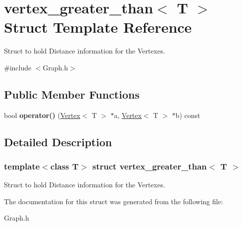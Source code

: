 \hypertarget{structvertex__greater__than}{}\section{vertex\+\_\+greater\+\_\+than$<$ T $>$ Struct Template Reference}
\label{structvertex__greater__than}


Struct to hold Distance information for the Vertexes.  




{\ttfamily \#include $<$Graph.\+h$>$}

\subsection*{Public Member Functions}
\begin{DoxyCompactItemize}
\item 
\hypertarget{structvertex__greater__than_acb041eee618f7d56a3685c7aaf347df6}{}\label{structvertex__greater__than_acb041eee618f7d56a3685c7aaf347df6} 
bool {\bfseries operator()} (\hyperlink{class_vertex}{Vertex}$<$ T $>$ $\ast$a, \hyperlink{class_vertex}{Vertex}$<$ T $>$ $\ast$b) const
\end{DoxyCompactItemize}


\subsection{Detailed Description}
\subsubsection*{template$<$class T$>$\newline
struct vertex\+\_\+greater\+\_\+than$<$ T $>$}

Struct to hold Distance information for the Vertexes. 

The documentation for this struct was generated from the following file\+:\begin{DoxyCompactItemize}
\item 
Graph.\+h\end{DoxyCompactItemize}

